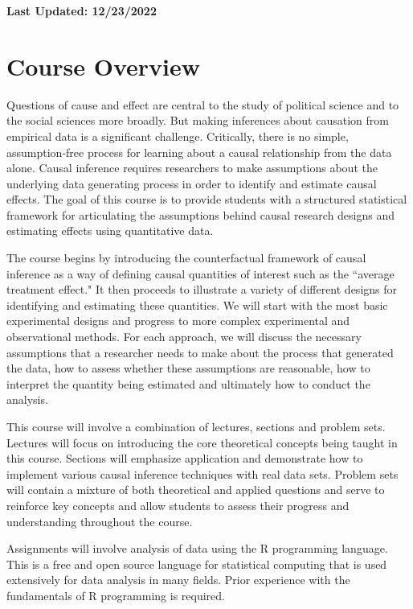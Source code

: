 \documentclass[11pt, article, oneside]{memoir}
\title{{\mytitle}}
\author{\myauthor\smallskip\footnotesize\newline Office: Pick Hall 328, 3rd floor
  \newline Office Hours: Tuesdays 4pm-6pm or schedule an appointment by e-mail \newline
    \myemail \newline \mywebsite
\newline \newline
Teaching Assistant: Oscar Cuadros\newline
Office Hours: TBD \newline
\texttt{\href{mailto:oscarcuadros@uchicago.edu}{oscarcuadros@uchicago.edu}}
}
\date{}
\theoremstyle{Assumption}
\begin{document}
\maketitle
\textbf{Last Updated: 12/23/2022}
\section*{Course Overview}

Questions of cause and effect are central to the study of political science and to the social sciences more broadly. But making inferences about causation from empirical data is a significant challenge. Critically, there is no simple, assumption-free process for learning about a causal relationship from the data alone. Causal inference requires researchers to make assumptions about the underlying data generating process in order to identify and estimate causal effects. The goal of this course is to provide students with a structured statistical framework for articulating the assumptions behind causal research designs and estimating effects using quantitative data. 

The course begins by introducing the counterfactual framework of causal inference as a way of defining causal quantities of interest such as the ``average treatment effect." It then proceeds to illustrate a variety of different designs for identifying and estimating these quantities. We will start with the most basic experimental designs and progress to more complex experimental and observational methods. For each approach, we will discuss the necessary assumptions that a researcher needs to make about the process that generated the data, how to assess whether these assumptions are reasonable, how to interpret the quantity being estimated and ultimately how to conduct the analysis. 

This course will involve a combination of lectures, sections and problem sets. Lectures will focus on introducing the core theoretical concepts being taught in this course. Sections will emphasize application and demonstrate how to implement various causal inference techniques with real data sets. Problem sets will contain a mixture of both theoretical and applied questions and serve to reinforce key concepts and allow students to assess their progress and understanding throughout the course.

Assignments will involve analysis of data using the R programming language. This is a free and open source language for statistical computing that is used extensively for data analysis in many fields. Prior experience with the fundamentals of R programming is required.
\end{document}
